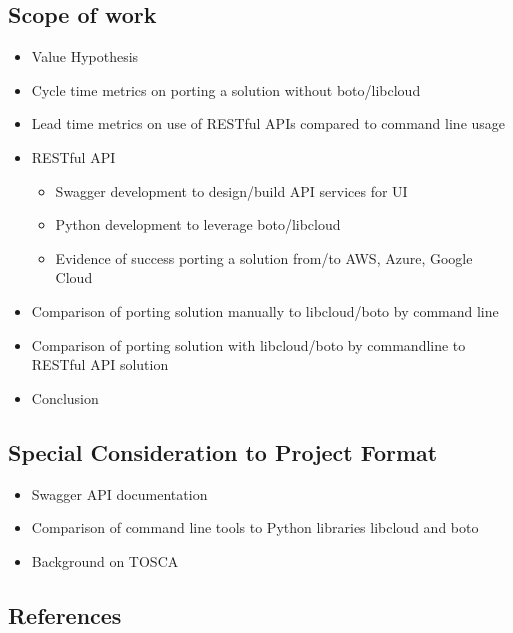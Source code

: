 \subsection{Scope of work}\label{scope-of-work}

\begin{itemize}
\item
  Value Hypothesis
\item
  Cycle time metrics on porting a solution without boto/libcloud
\item
  Lead time metrics on use of RESTful APIs compared to command line
  usage
\item
  RESTful API

  \begin{itemize}
    \item
    Swagger development to design/build API services for UI
  \item
    Python development to leverage boto/libcloud
  \item
    Evidence of success porting a solution from/to AWS, Azure, Google
    Cloud
  \end{itemize}
\item
  Comparison of porting solution manually to libcloud/boto by command
  line
\item
  Comparison of porting solution with libcloud/boto by commandline to
  RESTful API solution
\item
  Conclusion
\end{itemize}

\hypertarget{special-consideration-to-project-format}{%
\subsection{Special Consideration to Project
Format}\label{special-consideration-to-project-format}}

\begin{itemize}
\item
  Swagger API documentation
\item
  Comparison of command line tools to Python libraries libcloud and boto
\item
  Background on TOSCA
\end{itemize}

\subsection{References}\label{references}


